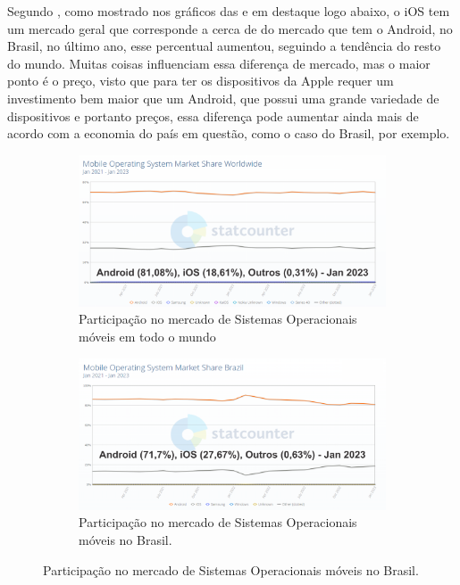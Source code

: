 Segundo \cite{stats2020mobile}, como mostrado nos gráficos das  e  em destaque logo abaixo, o iOS tem um mercado geral que corresponde a cerca de  do mercado que tem o Android, no Brasil, no último ano, esse percentual aumentou, seguindo a tendência do resto do mundo. Muitas coisas influenciam essa diferença de mercado, mas o maior ponto é o preço, visto que para ter os dispositivos da Apple requer um investimento bem maior que um Android, que possui uma grande variedade de dispositivos e portanto preços, essa diferença pode aumentar ainda mais de acordo com a economia do país em questão, como o caso do Brasil, por exemplo.

\begin{figure}[H]
\centering
\begin{subfigure}{\textwidth}
   \includegraphics[width=1\linewidth]{images/mobile_operating_system_market_share_w.png}
   \caption{Participação no mercado de Sistemas Operacionais móveis em todo o mundo}
   \label{fig:mobile_operating_system_market_share_w} 
\end{subfigure}

\begin{subfigure}{\textwidth}
   \includegraphics[width=1\linewidth]{images/mobile_operating_system_market_share_br.png}
   \caption{Participação no mercado de Sistemas Operacionais móveis no Brasil.}
   \label{fig:mobile_operating_system_market_share_br}
\end{subfigure}
\end{figure}

